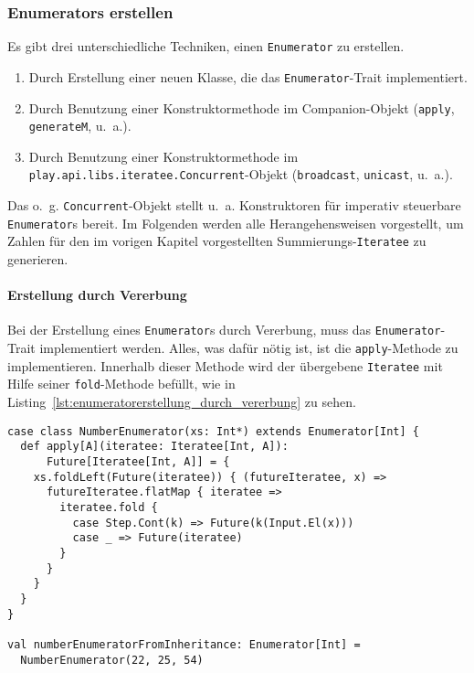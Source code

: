 \subsubsection{Enumerators erstellen} %
\label{ssub:enumerators_erstellen}

Es gibt drei unterschiedliche Techniken, einen \lstinline|Enumerator| zu erstellen.
\begin{enumerate}
  \item Durch Erstellung einer neuen Klasse, die das \lstinline|Enumerator|-Trait implementiert.
  \item Durch Benutzung einer Konstruktormethode im Companion-Objekt (\lstinline|apply|, \lstinline|generateM|, u.~a.).
  \item Durch Benutzung einer Konstruktormethode im \lstinline|play.api.libs.iteratee.Concurrent|-Objekt (\lstinline|broadcast|, \lstinline|unicast|, u.~a.).
\end{enumerate}

Das o.~g. \lstinline|Concurrent|-Objekt stellt u.~a. Konstruktoren für imperativ steuerbare \lstinline|Enumerator|s bereit.
Im Folgenden werden alle Herangehensweisen vorgestellt, um Zahlen für den im vorigen Kapitel vorgestellten Summierungs-\lstinline|Iteratee| zu generieren.

\paragraph{Erstellung durch Vererbung} %
\label{par:enumeratorerstellung_durch_vererbung}\mbox{} %

Bei der Erstellung eines \lstinline|Enumerator|s durch Vererbung, muss das \lstinline|Enumerator|-Trait implementiert werden.
Alles, was dafür nötig ist, ist die \lstinline|apply|-Methode zu implementieren.
Innerhalb dieser Methode wird der übergebene \lstinline|Iteratee| mit Hilfe seiner \lstinline|fold|-Methode befüllt, wie in Listing~\ref{lst:enumeratorerstellung_durch_vererbung} zu sehen.

\begin{lstlisting}[caption=Erstellung eines Enumerators durch Vererbung, label=lst:enumeratorerstellung_durch_vererbung]
case class NumberEnumerator(xs: Int*) extends Enumerator[Int] {
  def apply[A](iteratee: Iteratee[Int, A]):
      Future[Iteratee[Int, A]] = {
    xs.foldLeft(Future(iteratee)) { (futureIteratee, x) =>
      futureIteratee.flatMap { iteratee =>
        iteratee.fold {
          case Step.Cont(k) => Future(k(Input.El(x)))
          case _ => Future(iteratee)
        }
      }
    }
  }
}

val numberEnumeratorFromInheritance: Enumerator[Int] =
  NumberEnumerator(22, 25, 54)
\end{lstlisting}

